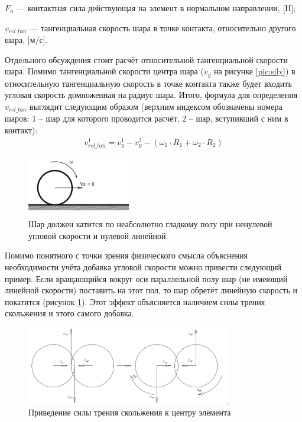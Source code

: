 \documentclass[a4paper]{article}
\begin{document}
$F_n$ --- контактная сила действующая на элемент в нормальном направлении, [Н];

$v_{rel\_tan}$ --- тангенциальная скорость шара в точке контакта, относительно другого шара, [м/с].


Отдельного обсуждения стоит расчёт относительной тангенциальной скорости шара. 
Помимо тангенциальной скорости центра шара ($v_y$ на рисунке \ref{pic:sily}) в относительную тангенциальную скорость в точке контакта также будет входить угловая скорость домноженная на радиус шара.
Итого, формула для определения $v_{rel\_tan}$ выглядит следующим образом (верхним индексом обозначены номера шаров: 1 -- шар для которого проводится расчёт, 2 -- шар, вступивший с ним в контакт):
\begin{align}
\label{rel_tan_velocity}
v_{rel\_tan}^{1} = v_{y}^{1} - v_{y}^{2} - \left( \omega_1 \cdot R_1 + \omega_2 \cdot R_2 \right)
\end{align}

\begin{figure}[h!]
	\centering
	\includegraphics[width=0.4\textwidth]{pol_omega}
	\caption{Шар должен катится по неабсолютно гладкому полу при ненулевой угловой скорости и нулевой линейной.}
	\label{pic:pol_omega}
\end{figure} 

Помимо понятного с точки зрения физического смысла объяснения необходимости учёта добавка угловой скорости можно привести следующий пример. 
Если вращающийся вокруг оси параллельной полу шар (не имеющий линейной скорости) поставить на этот пол, то шар обретёт линейную скорость и покатится (рисунок \ref{pic:pol_omega}). 
Этот эффект объясняется наличием силы трения скольжения и этого самого добавка.

\begin{figure}[h!]
	\centering
	\includegraphics[width=0.8\textwidth]{fs_ms}
	\caption{Приведение силы трения скольжения к центру элемента}
	\label{pic:fs_ms}
\end{figure} 
\end{document}
